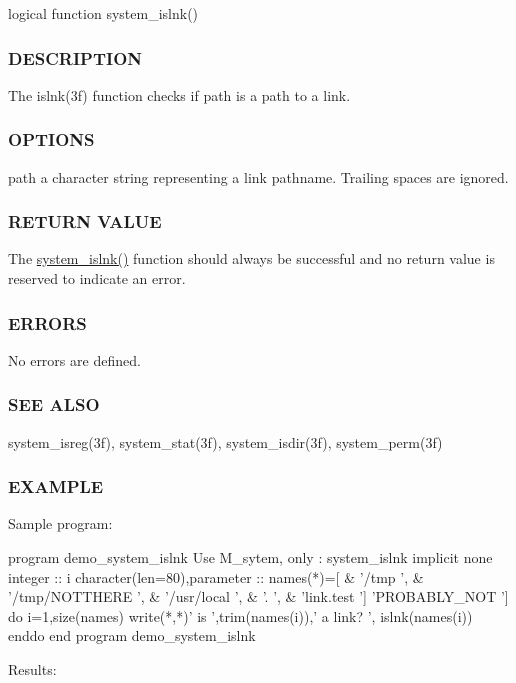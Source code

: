 \begin{DoxyVerb}logical function system_islnk()
\end{DoxyVerb}


\subsubsection*{D\+E\+S\+C\+R\+I\+P\+T\+I\+ON}

The islnk(3f) function checks if path is a path to a link.

\subsubsection*{O\+P\+T\+I\+O\+NS}

path a character string representing a link pathname. Trailing spaces are ignored.

\subsubsection*{R\+E\+T\+U\+RN V\+A\+L\+UE}

The \hyperlink{namespacem__system_ab05694cc3d76a3ecc87e4b4490c4c217}{system\+\_\+islnk()} function should always be successful and no return value is reserved to indicate an error.

\subsubsection*{E\+R\+R\+O\+RS}

No errors are defined.

\subsubsection*{S\+EE A\+L\+SO}

system\+\_\+isreg(3f), system\+\_\+stat(3f), system\+\_\+isdir(3f), system\+\_\+perm(3f)

\subsubsection*{E\+X\+A\+M\+P\+LE}

\begin{DoxyVerb}    Sample program:

       program demo_system_islnk
       Use M_sytem, only : system_islnk
       implicit none
       integer                     :: i
       character(len=80),parameter :: names(*)=[ &
       '/tmp            ', &
       '/tmp/NOTTHERE   ', &
       '/usr/local      ', &
       '.               ', &
       'link.test       ']
       'PROBABLY_NOT    ']
       do i=1,size(names)
          write(*,*)' is ',trim(names(i)),' a link? ', islnk(names(i))
       enddo
       end program demo_system_islnk

    Results: \end{DoxyVerb}
 


